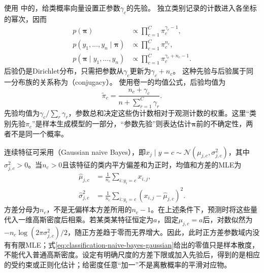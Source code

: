 使用
中的，给类概率向量设置正参数$\gamma_c$的先验。
独立类别记录的计数进入各坐标的幂次，因而
\[
  \begin{aligned}
    p(\bm{\pi})
      &\propto\prod_{c=1}^{C}\pi_c^{\gamma_c-1},\\
    p(y_1,\ldots,y_n\mid\bm{\pi})
      &\propto\prod_{c=1}^{C}\pi_c^{n_c},\\
    p(\bm{\pi}\mid y_1,\ldots,y_n)
      &\propto\prod_{c=1}^{C}\pi_c^{\gamma_c+n_c-1}.
  \end{aligned}
\]
后验仍是Dirichlet分布，只需把参数从$\gamma_c$更新为$\gamma_c+n_c$。
这种先验与后验属于同一分布族的关系称为（conjugacy）。
使用卷一的均值公式，后验均值为
\[
  \tilde\pi_c=\frac{n_c+\gamma_c}
  {n+\sum_{r=1}^{C}\gamma_r}.
\]
先验均值为$\gamma_c/\sum_r\gamma_r$，参数总和决定这些伪计数相对于观测计数的权重。这里“类别先验$\pi_c$”是样本生成模型的一部分，“参数先验”则表达估计$\bm{\pi}$前的不确定性，两者不是同一个概率。

连续特征可采用（Gaussian naive Bayes），即$x_j\mid y=c\sim\mathcal{N}(\mu_{j,c},\sigma_{j,c}^{2})$，其中$\sigma_{j,c}^{2}>0$。当$n_c>0$且该特征的类内平方偏差和为正时，均值和方差的MLE为
\begin{equation}
  \label{eq:classification-naive-bayes-gaussian}
  \begin{aligned}
    \hat\mu_{j,c}
      &=\frac{1}{n_c}\sum_{i:y_i=c}x_{i,j},\\
    \hat\sigma_{j,c}^{2}
      &=\frac{1}{n_c}\sum_{i:y_i=c}
        (x_{i,j}-\hat\mu_{j,c})^2.
  \end{aligned}
\end{equation}
方差分母为$n_c$，不是无偏样本方差所用的$n_c-1$。在上述条件下，预测时将这些量代入一维高斯密度后相乘。若某类某特征恒定为$a$，固定$\mu_{j,c}=a$后，对数似然为$-n_c\log(2\pi\sigma_{j,c}^{2})/2$，随正方差趋于零而无界增大。因此，此时正方差参数域内没有有限MLE；式\eqref{eq:classification-naive-bayes-gaussian}给出的零值只是样本散度，不能代入普通高斯密度。设定有明确尺度的方差下限或加入先验后，得到的是相应的受约束或正则化估计；给密度任意“加一”不是离散概率的平滑对应物。

